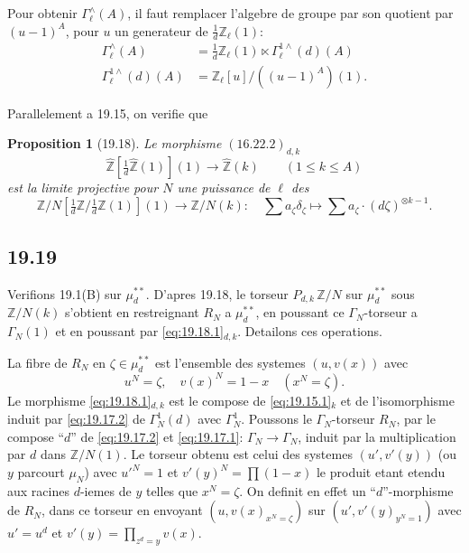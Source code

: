 \documentclass[12pt,a4paper]{article}
\theoremstyle{plain}
\newtheorem{proposition}[theorem]{Proposition}
\theoremstyle{definition}
\theoremstyle{remark}
\newcommand{\ZZ}{\mathbb{Z}}
\begin{document}
Pour obtenir $\Gamma_\ell^\wedge(A)$, il faut remplacer l'algebre de
groupe par son quotient par $(u-1)^A$, pour $u$ un generateur de
$\frac{1}{d}\ZZ_\ell(1)$:
\begin{align*}
\Gamma_\ell^\wedge(A) &= \tfrac{1}{d}\ZZ_\ell(1) \ltimes
\Gamma_\ell^{1\wedge}(d)(A) \\
\Gamma_\ell^{1\wedge}(d)(A) &= \ZZ_\ell[u]/((u-1)^A)(1).
\end{align*}

Parallelement a 19.15, on verifie que

\begin{proposition}[19.18]\label{prop:19.18}
Le morphisme $(16.22.2)_{d,k}$
\[
\hat{\ZZ}[\tfrac{1}{d}\hat{\ZZ}(1)](1) \to \hat{\ZZ}(k) \qquad (1 \leq k
\leq A)
\]
est la limite projective pour $N$ une puissance de $\ell$ des
\begin{equation}\label{eq:19.18.1}
\ZZ/N[\tfrac{1}{d}\ZZ/\tfrac{1}{d}\ZZ(1)](1) \to \ZZ/N(k) : \quad
\sum a_\zeta \delta_\zeta \longmapsto \sum a_\zeta \cdot (d\zeta)^{\otimes k-1}.
\end{equation}
\end{proposition}

\subsection{19.19}

Verifions 19.1(B) sur $\mu_d^{**}$. D'apres 19.18, le torseur
$P_{d,k}\, \ZZ/N$ sur $\mu_d^{**}$ sous $\ZZ/N(k)$ s'obtient en
restreignant $R_N$ a $\mu_d^{**}$, en poussant ce
$\Gamma_N$-torseur a $\Gamma_N(1)$ et en poussant par
\eqref{eq:19.18.1}$_{d,k}$. Detailons ces operations.

La fibre de $R_N$ en $\zeta \in \mu_d^{**}$ est l'ensemble des
systemes $(u, v(x))$ avec
\[
u^N = \zeta, \quad v(x)^N = 1-x \quad (x^N = \zeta).
\]
Le morphisme \eqref{eq:19.18.1}$_{d,k}$ est le compose de
\eqref{eq:19.15.1}$_k$ et de l'isomorphisme induit par
\eqref{eq:19.17.2} de $\Gamma_N^1(d)$ avec $\Gamma_N^1$. Poussons le
$\Gamma_N$-torseur $R_N$, par le compose ``$d$'' de
\eqref{eq:19.17.2} et \eqref{eq:19.17.1}: $\Gamma_N \to \Gamma_N$,
induit par la multiplication par $d$ dans $\ZZ/N(1)$. Le torseur
obtenu est celui des systemes $(u', v'(y))$ (ou $y$ parcourt
$\mu_N$) avec $u'^N = 1$ et $v'(y)^N = \prod(1-x)$ le produit etant
etendu aux racines $d$-iemes de $y$ telles que $x^N = \zeta$. On
definit en effet un ``$d$''-morphisme de $R_N$, dans ce torseur en
envoyant $(u, v(x)_{x^N=\zeta})$ sur $(u', v'(y)_{y^N=1})$ avec
$u' = u^d$ et $v'(y) = \prod_{z^d=y} v(x)$.
\end{document}
